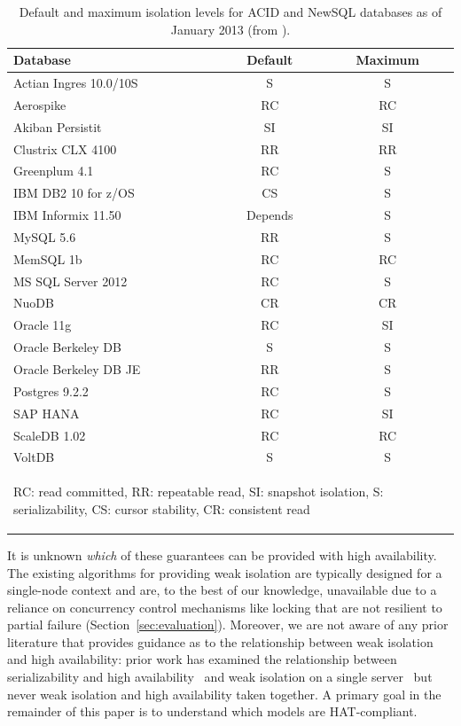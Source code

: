 \begin{table}
\begin{center}
\begin{small}
\begin{tabular}{|l|c|c|}
\hline
Database & Default & Maximum\\\hline
Actian Ingres 10.0/10S & S & S\\
Aerospike & RC & RC\\
Akiban Persistit & SI & SI\\
Clustrix CLX 4100 & RR & RR\\
Greenplum 4.1 & RC & S \\
IBM DB2 10 for z/OS & CS & S\\
IBM Informix 11.50 & Depends & S\\
MySQL 5.6 & RR & S \\
MemSQL 1b & RC & RC\\
MS SQL Server 2012 & RC & S \\
NuoDB & CR & CR\\
Oracle 11g & RC & SI\\
Oracle Berkeley DB & S & S\\
Oracle Berkeley DB JE & RR & S\\
Postgres 9.2.2 & RC & S\\
SAP HANA & RC & SI\\
ScaleDB 1.02 & RC & RC\\
VoltDB & S & S\\
\hline
\multicolumn{3}{|p{7cm}|}{{\begin{small}{RC: read committed, RR: repeatable read, SI: snapshot isolation, S: serializability, CS: cursor stability, CR: consistent read}\end{small}}}\\\hline

\end{tabular}
\caption{Default and maximum isolation levels for ACID and NewSQL
  databases as of January 2013 (from
  \protect\cite{hat-hotos}).}\vspace{-2.5em}
\label{table:existing}
\end{small}
\end{center}
\end{table}

It is unknown \textit{which} of these guarantees can be provided with
high availability. The existing algorithms for providing weak
isolation are typically designed for a single-node context and are, to
the best of our knowledge, unavailable due to a reliance on
concurrency control mechanisms like locking that are not resilient to
partial failure (Section~\ref{sec:evaluation}). Moreover, we are not
aware of any prior literature that provides guidance as to the
relationship between weak isolation and high availability: prior work
has examined the relationship between serializability and high
availability~\cite{davidson-survey} and weak isolation on a single
server~\cite{adya, ansicritique, gray-isolation} but never weak
isolation and high availability taken together.  A primary goal in the
remainder of this paper is to understand which models are
HAT-compliant.

